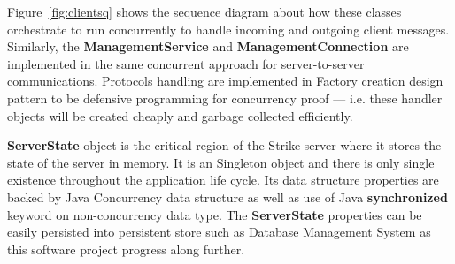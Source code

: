 \documentclass[dareport.tex]{subfiles}
\begin{document}

Figure~\ref{fig:clientsq} shows the sequence diagram about how these classes orchestrate to run concurrently to handle incoming and outgoing client messages. Similarly, the \textbf{ManagementService} and \textbf{ManagementConnection} are implemented in the same concurrent approach for server-to-server communications. Protocols handling are implemented in Factory creation design pattern to be defensive programming for concurrency proof --- i.e. these handler objects will be created cheaply and garbage collected efficiently.


\textbf{ServerState} object is the critical region of the Strike server where it stores the state of the server in memory. It is an Singleton object and there is only single existence throughout the application life cycle. Its data structure properties are backed by Java Concurrency data structure as well as use of Java \textbf{synchronized} keyword on non-concurrency data type. The \textbf{ServerState} properties can be easily persisted into persistent store such as Database Management System as this software project progress along further.
\end{document}
